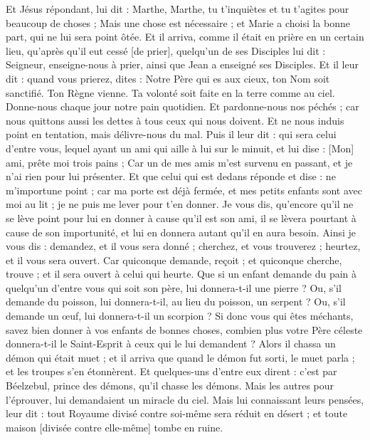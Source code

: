 \begin{multicols}{2}
Et Jésus répondant, lui dit : Marthe, Marthe, tu t'inquiètes et tu t'agites pour beaucoup de choses ;
Mais une chose est nécessaire ; et Marie a choisi la bonne part, qui ne lui sera point ôtée.
\VerseOne{}Et il arriva, comme il était en prière en un certain lieu, qu'après qu'il eut cessé [de prier], quelqu'un de ses Disciples lui dit : Seigneur, enseigne-nous à prier, ainsi que Jean a enseigné ses Disciples.
Et il leur dit : quand vous prierez, dites : Notre Père qui es aux cieux, ton Nom soit sanctifié. Ton Règne vienne. Ta volonté soit faite en la terre comme au ciel.
Donne-nous chaque jour notre pain quotidien.
Et pardonne-nous nos péchés ; car nous quittons aussi les dettes à tous ceux qui nous doivent. Et ne nous induis point en tentation, mais délivre-nous du mal.
Puis il leur dit : qui sera celui d'entre vous, lequel ayant un ami qui aille à lui sur le minuit, et lui dise : [Mon] ami, prête moi trois pains ;
Car un de mes amis m'est survenu en passant, et je n'ai rien pour lui présenter.
Et que celui qui est dedans réponde et dise : ne m'importune point ; car ma porte est déjà fermée, et mes petits enfants sont avec moi au lit ; je ne puis me lever pour t'en donner.
Je vous dis, qu'encore qu'il ne se lève point pour lui en donner à cause qu'il est son ami, il se lèvera pourtant à cause de son importunité, et lui en donnera autant qu'il en aura besoin.
Ainsi je vous dis : demandez, et il vous sera donné ; cherchez, et vous trouverez ; heurtez, et il vous sera ouvert.
Car quiconque demande, reçoit ; et quiconque cherche, trouve ; et il sera ouvert à celui qui heurte.
Que si un enfant demande du pain à quelqu'un d'entre vous qui soit son père, lui donnera-t-il une pierre ? Ou, s'il demande du poisson, lui donnera-t-il, au lieu du poisson, un serpent ?
Ou, s'il demande un œuf, lui donnera-t-il un scorpion ?
Si donc vous qui êtes méchants, savez bien donner à vos enfants de bonnes choses, combien plus votre Père céleste donnera-t-il le Saint-Esprit à ceux qui le lui demandent ?
Alors il chassa un démon qui était muet ; et il arriva que quand le démon fut sorti, le muet parla ; et les troupes s'en étonnèrent.
Et quelques-uns d'entre eux dirent : c'est par Béelzebul, prince des démons, qu'il chasse les démons.
Mais les autres pour l'éprouver, lui demandaient un miracle du ciel.
Mais lui connaissant leurs pensées, leur dit : tout Royaume divisé contre soi-même sera réduit en désert ; et toute maison [divisée contre elle-même] tombe en ruine.

\end{multicols}
